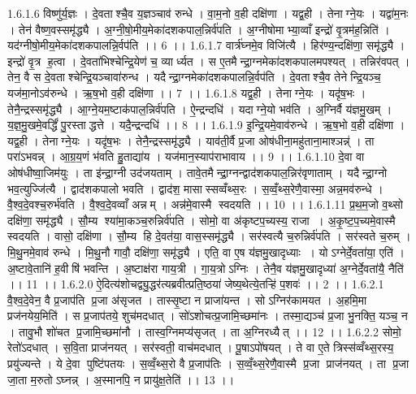 1.6.1.6
विष्णु॑र्य॒ज्ञः । दे॒वताश्चै॒व य॒ज्ञञ्चाव॑ रुन्धे । वा॒म॒नो व॒ही दक्षि॑णा । यद्व॒ही । तेनाग्ने॒यः । यद्वा॑म॒नः । तेन॑ वैष्ण॒वस्समृ॑द्ध्यै । अ॒ग्नी॒षो॒मीय॒मेका॑दशकपाल॒न्निर्व॑पति । अ॒ग्नीषोमाभ्या॒व्वाँ इन्द्रो॑ वृ॒त्रम॑ह॒न्निति॑ । यद॑ग्नीषो॒मीय॒मेका॑दशकपालन्नि॒र्वप॑ति ।। 6 ।।
1.6.1.7
वार्त्र॑घ्नमे॒व विजि॑त्यै । हिर॑ण्य॒न्दक्षि॑णा॒ समृ॑द्ध्यै । इन्द्रो॑ वृ॒त्र ह॒त्वा । दे॒वता॑भिश्चेन्द्रि॒येण॑ च॒ व्यार्ध्यत । स ए॒तमैन्द्रा॒ग्नमेका॑दशकपालमपश्यत् । तन्निर॑वपत् । तेन॒ वै स दे॒वताश्चेन्द्रि॒यञ्चावा॑रुन्ध । यदैन्द्रा॒ग्नमेका॑दशकपालन्नि॒र्वप॑ति । दे॒वताश्चै॒व तेनेन्द्रि॒यञ्च॒ यज॑मा॒नोऽव॑रुन्धे । ऋ॒ष॒भो व॒ही दक्षि॑णा ।। 7 ।।
1.6.1.8
यद्व॒ही । तेनाग्ने॒यः । यदृ॑ष॒भः । तेनै॒न्द्रस्समृ॑द्ध्यै । आ॒ग्ने॒यम॒ष्टाक॑पाल॒न्निर्व॑पति । ऐ॒न्द्रन्दधि॑ । यदाग्ने॒यो भव॑ति । अ॒ग्निर्वै य॑ज्ञमु॒खम् । य॒ज्ञ॒मु॒खमे॒वर्द्धिं॑ पु॒रस्ताद्धत्ते । यदै॒न्द्रन्दधि॑ ।। 8 ।।
1.6.1.9
इ॒न्द्रि॒यमे॒वाव॑रुन्धे । ऋ॒ष॒भो व॒ही दक्षि॑णा । यद्व॒ही । तेनाग्ने॒यः । यदृ॑ष॒भः । तेनै॒न्द्रस्समृ॑द्ध्यै । याव॑ती॒र्वै प्र॒जा ओष॑धीना॒महु॑ताना॒माश्ञन्न्॑ । ता परा॑ऽभवन्न् । आ॒ग्र॒य॒णं भ॑वति हु॒ताद्या॑य । यज॑मान॒स्याप॑राभावाय ।। 9 ।।
1.6.1.10
दे॒वा वा ओष॑धीष्वा॒जिम॑युः । ता इ॑न्द्रा॒ग्नी उद॑जयताम् । तावे॒तमैन्द्रा॒ग्नन्द्वाद॑शकपाल॒न्निर॑वृणाताम् । यदैन्द्रा॒ग्नो भव॒त्युज्जि॑त्यै । द्वाद॑शकपालो भवति । द्वाद॑श॒ मासास्सव्वँथ्स॒रः । स॒व्वँ॒थ्स॒रेणै॒वास्मा॒ अन्न॒मव॑रुन्धे । वै॒श्व॒दे॒वश्च॒रुर्भ॑वति । वै॒श्व॒दे॒वव्वाँ अन्नम् । अन्न॑मे॒वास्मै स्वदयति ।। 10 ।।
1.6.1.11
प्र॒थ॒म॒जो व॒थ्सो दक्षि॑णा॒ समृ॑द्ध्यै । सौ॒म्य श्या॑मा॒कञ्च॒रुन्निर्व॑पति । सोमो॒ वा अ॑कृष्टप॒च्यस्य॒ राजा । अ॒कृ॒ष्ट॒प॒च्यमे॒वास्मै स्वदयति । वासो॒ दक्षि॑णा । सौ॒म्य हि दे॒वत॑या॒ वास॒स्समृ॑द्ध्यै । सर॑स्वत्यै च॒रुन्निर्व॑पति । सर॑स्वते च॒रुम् । मि॒थु॒नमे॒वाव॑ रुन्धे । मि॒थु॒नौ गावौ॒ दक्षि॑णा॒ समृ॑द्ध्यै । एति॒ वा ए॒ष य॑ज्ञमु॒खादृध्याः । योऽग्नेर्दे॒वता॑या॒ एति॑ । अ॒ष्टावे॒तानि॑ ह॒वीषि॑ भवन्ति । अ॒ष्टाक्ष॑रा गाय॒त्री । गा॒य॒त्रोऽग्निः । तेनै॒व य॑ज्ञमु॒खादृध्या॑ अ॒ग्नेर्दे॒वता॑यै॒ नैति॑ ।। 11 ।।
1.6.2.0
ऐ॒दित्य॑शोचद्व्यु॒द्धर॑त्यब्रवीत्प्रति॒ष्ठया॑ जेष्य॒थेत्ये॒तऱ्हि॑ प॒शवः॑ ।। 2 ।।
1.6.2.1
वै॒श्व॒दे॒वेन॒ वै प्र॒जाप॑ति प्र॒जा अ॑सृजत । तास्सृ॒ष्टा न प्राजा॑यन्त । सोऽग्निर॑कामयत । अ॒हमि॒मा प्रज॑नयेय॒मिति॑ । स प्र॒जाप॑तये॒ शुच॑मदधात् । सो॑ऽशोचत्प्र॒जामि॒च्छमा॑नः । तस्मा॒द्यञ्च॑ प्र॒जा भु॒नक्ति॒ यञ्च॒ न । तावु॒भौ शो॑चत प्र॒जामि॒च्छमा॑नौ । तास्व॒ग्निमप्य॑सृजत् । ता अ॒ग्निरध्यैत् ।। 12 ।।
1.6.2.2
सोमो॒ रेतो॑ऽदधात् । स॒वि॒ता प्राज॑नयत् । सर॑स्वती॒ वाच॑मदधात् । पू॒षाऽपो॑षयत् । ते वा ए॒ते त्रिस्स॑व्वँथ्स॒रस्य॒ प्रयु॑ज्यन्ते । ये दे॒वा पुष्टि॑पतयः । स॒व्वँ॒थ्स॒रो वै प्र॒जाप॑तिः । स॒व्वँ॒थ्स॒रेणै॒वास्मै प्र॒जा प्राज॑नयत् । ता प्र॒जा जा॒ता म॒रुतोऽघ्नन्न् । अ॒स्मानपि॒ न प्रायु॑क्ष॒तेति॑ ।। 13 ।।
